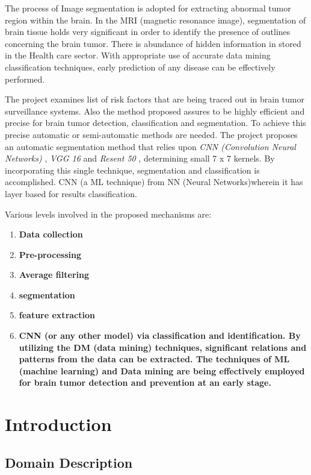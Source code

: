 \documentclass[11pt]{article}
\begin{document}
	The process of Image segmentation is adopted for extracting abnormal tumor
	region within the brain. In the MRI (magnetic resonance image), segmentation
	of brain tissue holds very significant in order to identify the presence of
	outlines concerning the brain tumor. There is abundance of hidden
	information in stored in the Health care sector. With appropriate use of
	accurate data mining classification techniques, early prediction of any
	disease can be effectively performed.

	The project examines list of risk factors that are being traced out in brain
	tumor surveillance systems. Also the method proposed assures to be highly
	efficient and precise for brain tumor detection, classification and
	segmentation. To achieve this precise automatic or semi-automatic methods
	are needed. The project proposes an automatic segmentation method that
	relies upon \textit{ CNN (Convolution Neural Networks) }, \textit{ VGG 16 }
	and \textit{ Resent 50 }, determining small 7 x 7 kernels. By incorporating
	this single technique, segmentation and classification is accomplished. CNN
	(a ML technique) from NN (Neural Networks)wherein it has layer based for
	results classification.

	Various levels involved in the proposed mechanisms are:

	\begin{enumerate}
		\item \textbf{ Data collection }
		\item \textbf{ Pre-processing }
		\item \textbf{ Average filtering }
		\item \textbf{ segmentation }
		\item \textbf{ feature extraction }
		\item \textbf{CNN (or any other model) via classification and identification. By
			utilizing the DM (data mining) techniques, significant relations and
			patterns from the data can be extracted. The techniques of ML
			(machine learning) and Data mining are being effectively employed
			for brain tumor detection and prevention at an early stage.}
	\end{enumerate}

	\section[introduction]{\hfill \Huge Introduction \hfill}
	\subsection[domain description]{Domain Description}
\end{document}
